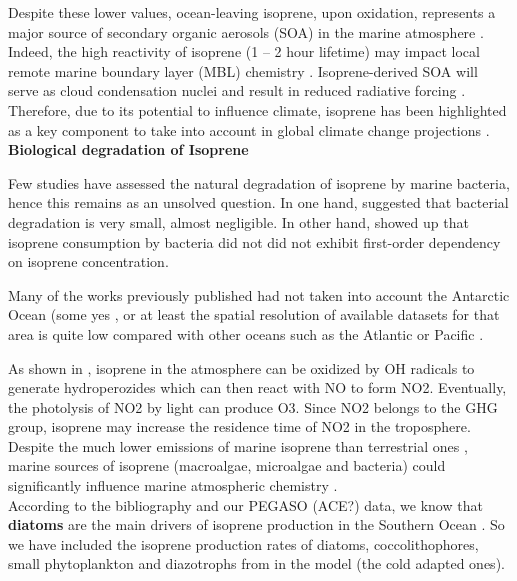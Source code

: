 \documentclass[draft,linenumbers]{agujournal}
\begin{document}
Despite these lower values, ocean-leaving isoprene, upon oxidation, represents a major source of secondary organic aerosols (SOA) in the marine atmosphere \citep{claeys2004formation,liao2007biogenic,gantt2009new, luo2010numerical}.
Indeed, the high reactivity of isoprene (1 -- 2 hour lifetime) may impact local remote marine boundary layer (MBL) chemistry \citep{palmer2005quantifying}. Isoprene-derived SOA will serve as cloud condensation nuclei and result in reduced radiative forcing \citep{claeys2004formation}. 
Therefore, due to its potential to influence climate, isoprene has been highlighted as a key component to take into account in global climate change projections \citep{meskhidze2006phytoplankton,arnold2009evaluation}.\\

\textbf{Biological degradation of Isoprene}

Few studies have assessed the natural degradation of isoprene by marine bacteria, hence this remains as an unsolved question. In one hand, \citep{shaw2003isoprene} suggested that bacterial degradation is very small, almost negligible. In other hand, \citep{alvarez2009characterization} showed up that isoprene consumption by bacteria did not did not exhibit first-order dependency on isoprene concentration.

Many of the works previously published had not taken into account the Antarctic Ocean (some yes \citep{meskhidze2006phytoplankton,kameyama2014high}, or at least the spatial resolution of available datasets for that area is quite low compared with other oceans such as the Atlantic or Pacific \citep{ooki2015global,booge2016can}. 

As shown in \citep{Sharkey2008}, isoprene in the atmosphere  can be oxidized by OH radicals to generate hydroperozides which can then react with NO to form NO2. Eventually, the photolysis of NO2 by light can produce O3. Since NO2 belongs to the GHG group, isoprene may increase the residence time of NO2 in the troposphere.\\

Despite the much lower emissions of marine isoprene than terrestrial ones \citep{bonsang1992evidence}, marine sources of isoprene (macroalgae, microalgae and bacteria) could significantly influence marine atmospheric chemistry \citep{moore1994production}.\\

According to the bibliography and our PEGASO (ACE?) data, we know that \textbf{diatoms} are the main drivers of isoprene production in the Southern Ocean \citep{exton2013chlorophyll,achyuthan2017volatile,dani2017relationship,hackenberg2017potential}. So we have included the isoprene production rates of diatoms, coccolithophores, small phytoplankton and diazotrophs from \citep{booge2016can} in the model (the cold adapted ones).
\end{document}

